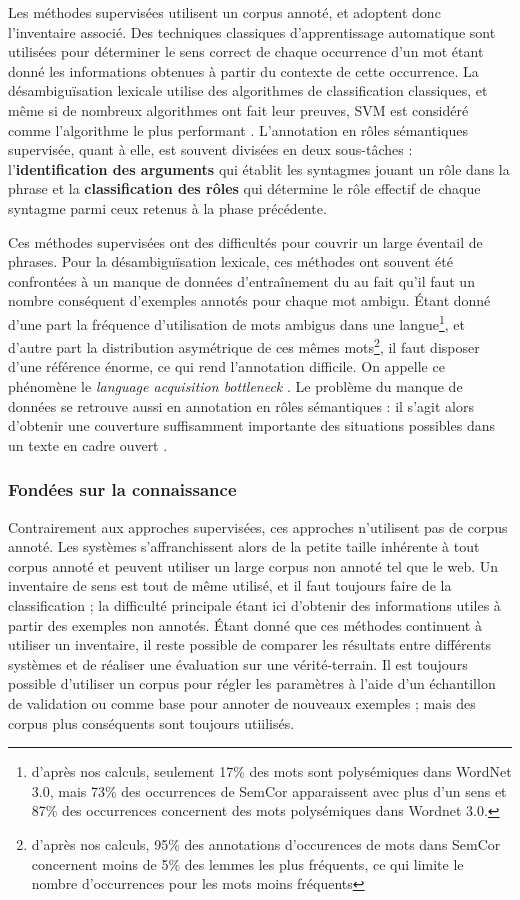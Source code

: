 Les méthodes supervisées utilisent un corpus annoté, et adoptent donc
l'inventaire associé. Des techniques classiques d'apprentissage automatique
sont utilisées pour déterminer le sens correct de chaque occurrence d'un mot
étant donné les informations obtenues à partir du contexte de cette occurrence.
La désambiguïsation lexicale utilise des algorithmes de classification
classiques, et même si de nombreux algorithmes ont fait leur preuves, SVM est
considéré comme l'algorithme le plus performant \cite{navigli2012quick}.
L'annotation en rôles sémantiques supervisée, quant à elle, est souvent
divisées en deux sous-tâches : l'\textbf{identification des arguments} qui
établit les syntagmes jouant un rôle dans la phrase et la
\textbf{classification des rôles} qui détermine le rôle effectif de chaque
syntagme parmi ceux retenus à la phase précédente.

Ces méthodes supervisées ont des difficultés pour couvrir un large éventail de
phrases. Pour la désambiguïsation lexicale, ces méthodes ont souvent été
confrontées à un manque de données d'entraînement du au fait qu'il faut un
nombre conséquent d'exemples annotés pour chaque mot ambigu. Étant donné d'une
part la fréquence d'utilisation de mots ambigus dans une
langue\footnote{d'après nos calculs, seulement 17\% des mots sont polysémiques
    dans WordNet 3.0, mais 73\% des occurrences de SemCor apparaissent avec
    plus d'un sens et 87\% des occurrences concernent des mots polysémiques
dans Wordnet 3.0.}, et d'autre part la distribution asymétrique de ces mêmes
mots\footnote{d'après nos calculs, 95\% des annotations d'occurences de mots
    dans SemCor concernent moins de 5\% des lemmes les plus fréquents, ce qui
limite le nombre d'occurrences pour les mots moins fréquents}, il faut disposer
d'une référence énorme, ce qui rend l'annotation difficile. On appelle ce
phénomène le \textit{language acquisition bottleneck} \citep{gale1992using}. Le
problème du manque de données se retrouve aussi en annotation en rôles
sémantiques : il s'agit alors d'obtenir une couverture suffisamment importante
des situations possibles dans un texte en cadre ouvert
\cite[p.~155]{marquez2008semantic}.

\subsubsection{Fondées sur la connaissance}

Contrairement aux approches supervisées, ces approches n'utilisent pas de
corpus annoté. Les systèmes s'affranchissent alors de la petite taille
inhérente à tout corpus annoté et peuvent utiliser un large corpus non annoté
tel que le web. Un inventaire de sens est tout de même utilisé, et il faut
toujours faire de la classification ; la difficulté principale étant ici
d'obtenir des informations utiles à partir des exemples non annotés. Étant
donné que ces méthodes continuent à utiliser un inventaire, il reste possible
de comparer les résultats entre différents systèmes et de réaliser une
évaluation sur une vérité-terrain. Il est toujours possible d'utiliser un
corpus pour régler les paramètres à l'aide d'un échantillon de validation ou
comme base pour annoter de nouveaux exemples ; mais des corpus plus conséquents
sont toujours utiilisés.

